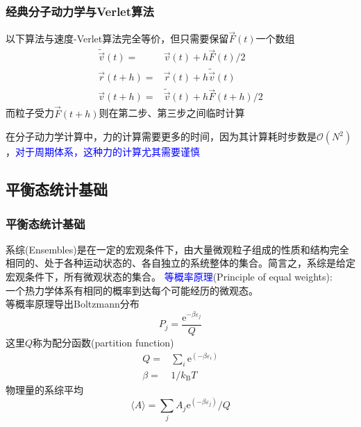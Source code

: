 \frame
{
	\frametitle{经典分子动力学与\textrm{Verlet}算法}
	以下算法与速度-\textrm{Verlet}算法完全等价，但只需要保留$\vec F(t)$一个数组
	\begin{displaymath}
		\begin{aligned}
			\tilde{\vec v}(t)=&\vec v(t)+h\vec F(t)/2\\
			\vec r(t+h)=&\vec r(t)+h\tilde{\vec v}(t)\\
			\vec v(t+h)=&\tilde{\vec v}(t)+h\vec F(t+h)/2
		\end{aligned}
	\end{displaymath}
	而粒子受力$\vec F(t+h)$则在第二步、第三步之间临时计算
\vskip 5pt
	{\fontsize{6.2pt}{4.2pt}}

	在分子动力学计算中，力的计算需要更多的时间，因为其计算耗时步数是$\mathscr{O}(N^2)$，\textcolor{blue}{对于周期体系，这种力的计算尤其需要谨慎}
}

\subsection{平衡态统计基础}
\frame
{
	\frametitle{平衡态统计基础}
	系综(\textrm{Ensembles})是在一定的宏观条件下，由大量微观粒子组成的性质和结构完全相同的、处于各种运动状态的、各自独立的系统整体的集合。简言之，系综是给定宏观条件下，所有微观状态的集合。
	\vskip 3pt
	\textcolor{blue}{等概率原理}\textrm{(Principle of equal weights)}:\\
	一个热力学体系有相同的概率到达每个可能经历的微观态。\\
	等概率原理导出\textrm{Boltzmann}分布
	\begin{displaymath}
		P_j=\dfrac{\mathrm{e}^{-\beta\varepsilon_j}}Q
	\end{displaymath}
	这里$Q$称为配分函数\textrm{(partition function)}
	\begin{displaymath}
		\begin{aligned}
			Q=&\sum_i\mathrm{e}^{(-\beta\varepsilon_i)}\\
			\beta=&1/k_{\mathrm{B}}T
		\end{aligned}
	\end{displaymath}
	物理量的系综平均
	\begin{displaymath}
		\langle A\rangle=\sum_jA_j\mathrm{e}^{(-\beta\varepsilon_j)}/Q
	\end{displaymath}
}

